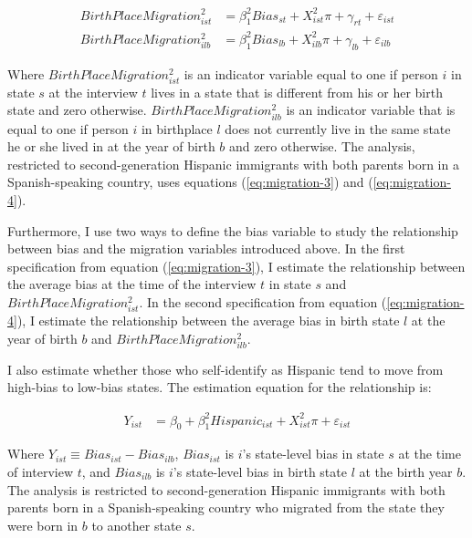 \documentclass[12pt,english]{article}
\begin{document}
\begin{align}
BirthPlaceMigration_{ist}^2 &= \beta_1^2 Bias_{st} 
                   + X_{ist}^2\pi + \gamma_{rt} 
                   + \varepsilon_{ist} \label{eq:migration-3} \\
BirthPlaceMigration_{ilb}^2 &= \beta_1^2 Bias_{lb} 
                   + X_{ilb}^2\pi + \gamma_{lb} 
                   + \varepsilon_{ilb} \label{eq:migration-4}
\end{align}

Where $BirthPlaceMigration_{ist}^2$ is an indicator variable equal to one if person $i$ in state $s$ at the interview $t$ lives in a state that is different from his or her birth state and zero otherwise. $BirthPlaceMigration_{ilb}^2$ is an indicator variable that is equal to one if person $i$ in birthplace $l$ does not currently live in the same state he or she lived in at the year of birth $b$ and zero otherwise. The analysis, restricted to second-generation Hispanic immigrants with both parents born in a Spanish-speaking country, uses equations (\ref{eq:migration-3}) and (\ref{eq:migration-4}). 

Furthermore, I use two ways to define the bias variable to study the relationship between bias and the migration variables introduced above. In the first specification from equation (\ref{eq:migration-3}), I estimate the relationship between the average bias at the time of the interview $t$ in state $s$ and $BirthPlaceMigration_{ist}^2$. In the second specification from equation (\ref{eq:migration-4}), I estimate the relationship between the average bias in birth state $l$ at the year of birth $b$ and $BirthPlaceMigration_{ilb}^2$.

I also estimate whether those who self-identify as Hispanic tend to move from high-bias to low-bias states. The estimation equation for the relationship is: 

\begin{align}
Y_{ist} &= \beta_0 + \beta_1^2 Hispanic_{ist} +
                   X_{ist}^2\pi
                   + \varepsilon_{ist} \label{eq:migration-5}
\end{align}

Where $Y_{ist} \equiv Bias_{ist} -  Bias_{ilb}$, $Bias_{ist}$ is $i$'s state-level bias in state $s$ at the time of interview $t$, and  $Bias_{ilb}$ is $i$'s state-level bias in birth state $l$ at the birth year $b$. The analysis is restricted to second-generation Hispanic immigrants with both parents born in a Spanish-speaking country who migrated from the state they were born in $b$ to another state $s$. 
\end{document}
